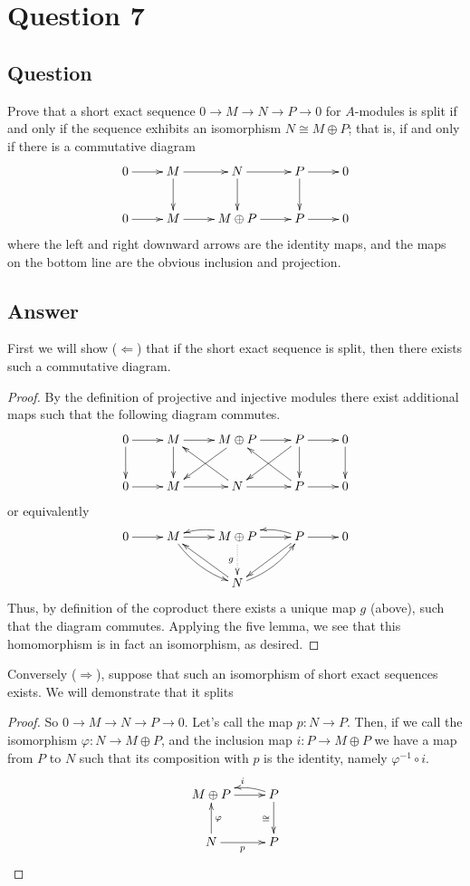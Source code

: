 \documentclass[11pt]{article}
\begin{document}
\section{Question 7}
\subsection{Question}Prove that a short exact sequence $0 \to M \to N \to P \to0$ for $A$-modules is split if and only if the sequence exhibits an isomorphism $N \cong M \oplus P$; that is, if and only if there is a commutative diagram
\[
\xymatrix{
0 \ar[r]  & M\ar[r]\ar[d] & N\ar[r]\ar[d] & P\ar[r]\ar[d] & 0\\
0 \ar[r]& M \ar[r]& M \oplus P\ar[r] & P\ar[r] & 0\\
}
\]
where the left and right downward arrows are the identity maps, and the maps on the bottom line are the obvious inclusion and projection.
\subsection{Answer}
First we will show ($\Leftarrow$) that if the short exact sequence is split, then there exists such a commutative diagram. 
\begin{proof}
By the definition of projective and injective modules there exist additional maps such that the following diagram commutes.
\[
\xymatrix{
0\ar[d] \ar[r]  & M\ar[r]\ar[d] & M \oplus P \ar[r]  \ar[dl]& P\ar[r]\ar[d] \ar[dl]& 0 \ar[d]\\
 0\ar[r]& M \ar[r]& N \ar[ul] \ar[r] & P \ar[ul] \ar[r] &0 \\
}
\]
or equivalently
\[
\xymatrix{
0\ar[r]  & M\ar[r] \ar@/_/[dr] & M \oplus P \ar@{.>}[d]_g \ar@/_/[l] \ar[r] & P \ar@/_/[l] \ar[r] \ar[dl]& 0 \\
& & N \ar[ul]   \ar@/_/[ur]& & \\
}
\]
Thus, by definition of the coproduct there exists a unique map $g$ (above), such that the diagram commutes. Applying the five lemma, we see that this homomorphism is in fact an isomorphism, as desired.
\end{proof}
Conversely ($\Rightarrow$), suppose that such an isomorphism of short exact sequences exists. We will demonstrate that it splits
\begin{proof}
So $0 \to M \to N\to P \to 0$. Let's call the map $p: N \to P$. Then, if we call the isomorphism $\varphi: N \to M \oplus P$, and the inclusion map $i : P \to M \oplus P$ we have a map from $P$ to $ N$ such that its composition with $p$ is the identity, namely $\varphi^{-1} \circ i $.
\[
\xymatrix{
 M \oplus P \ar[r]  & P\ar[d]_\cong \ar@/_/[l]_i  \\
 N \ar[u]_\varphi \ar[r]_p & P  \\
}
\]
\end{proof}
\end{document}
